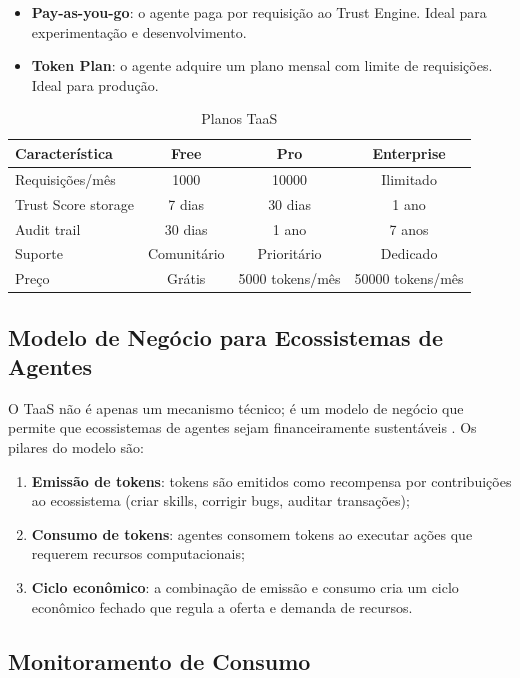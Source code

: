 \begin{itemize}
\item \textbf{Pay-as-you-go}: o agente paga por requisição ao
Trust Engine. Ideal para experimentação e desenvolvimento.
\item \textbf{Token Plan}: o agente adquire um plano mensal com
limite de requisições. Ideal para produção.
\end{itemize}

\begin{table}[htb]
\centering
\caption{Planos TaaS}
\label{tab:taas-plans}
\begin{tabular}{lccc}
\toprule
\textbf{Característica} & \textbf{Free} & \textbf{Pro} & \textbf{Enterprise} \\
\midrule
Requisições/mês & 1000 & 10000 & Ilimitado \\
Trust Score storage & 7 dias & 30 dias & 1 ano \\
Audit trail & 30 dias & 1 ano & 7 anos \\
Suporte & Comunitário & Prioritário & Dedicado \\
Preço & Grátis & 5000 tokens/mês & 50000 tokens/mês \\
\bottomrule
\end{tabular}
\end{table}

\subsection{Modelo de Negócio para Ecossistemas de Agentes}

O TaaS não é apenas um mecanismo técnico; é um modelo de negócio
que permite que ecossistemas de agentes sejam financeiramente
sustentáveis \cite{opencode2026ecosystem}. Os pilares do modelo
são:

\begin{enumerate}
\item \textbf{Emissão de tokens}: tokens são emitidos como
recompensa por contribuições ao ecossistema (criar skills,
corrigir bugs, auditar transações);
\item \textbf{Consumo de tokens}: agentes consomem tokens ao
executar ações que requerem recursos computacionais;
\item \textbf{Ciclo econômico}: a combinação de emissão e consumo
cria um ciclo econômico fechado que regula a oferta e demanda
de recursos.
\end{enumerate}

\subsection{Monitoramento de Consumo}

